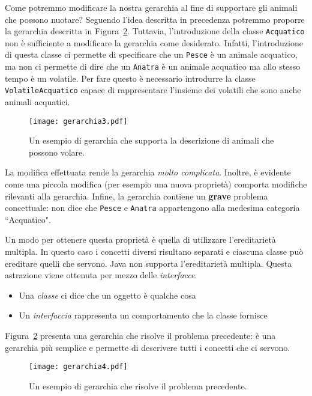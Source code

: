 \documentclass{article}
\begin{document}
Come potremmo modificare la nostra gerarchia al fine di supportare gli animali che possono nuotare?
Seguendo l'idea descritta in precedenza potremmo proporre la gerarchia descritta in Figura~\ref{Fig:gerarchy4}. Tuttavia, l'introduzione della classe \texttt{Acquatico} non \`e sufficiente a modificare la gerarchia come desiderato. Infatti, l'introduzione di questa classe ci permette di specificare che un \texttt{Pesce} \`e un animale acquatico, ma non ci permette di dire che un \texttt{Anatra} \`e un animale acquatico ma allo stesso tempo \`e un volatile. Per fare questo \`e necessario introdurre la classe \texttt{VolatileAcquatico} capace di rappresentare l'insieme dei volatili che sono anche animali acquatici.
\begin{figure}[h!]
  \centering
    \texttt{[image: gerarchia3.pdf]}
      \caption{Un esempio di gerarchia che supporta la descrizione di animali che possono volare.}
      \label{Fig:gerarchy4}
\end{figure}
La modifica effettuata rende la gerarchia \emph{molto complicata}. Inoltre, \`e evidente come una piccola modifica (per esempio una nuova  propriet\`a) comporta modifiche rilevanti alla gerarchia. Infine, la gerarchia contiene un \textbf{grave} problema concettuale: non dice che \texttt{Pesce} e \texttt{Anatra} appartengono alla medesima categoria ``Acquatico".

Un modo per ottenere questa propriet\`a \`e quella di utilizzare l'ereditariet\`a multipla. In questo caso i concetti diversi risultano separati e ciascuna classe pu\`o ereditare quelli che servono. Java non supporta l'ereditariet\`a multipla. Questa astrazione viene ottenuta per mezzo delle \emph{interfacce}.

\begin{itemize}
\item Una \emph{classe} ci dice che un oggetto \`e qualche cosa
\item Un \emph{interfaccia} rappresenta un comportamento che la classe fornisce
\end{itemize}

Figura~\ref{Fig:gerarchy4} presenta una gerarchia che risolve il problema precedente: \`e una gerarchia pi\`u semplice e permette di descrivere tutti i concetti che ci servono.
\begin{figure}[h!]
  \centering
    \texttt{[image: gerarchia4.pdf]}
      \caption{Un esempio di gerarchia che risolve il problema precedente.}
      \label{Fig:gerarchy4}
\end{figure}
\end{document}
